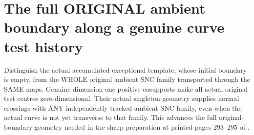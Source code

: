 \section{The full ORIGINAL ambient boundary along a genuine curve test history}

Distinguish the actual accumulated-exceptional template, whose initial
boundary is empty, from the WHOLE original ambient SNC family transported
through the SAME maps. Genuine dimension-one positive cosupports make
all actual original test centres zero-dimensional. Their actual singleton
geometry supplies normal crossings with ANY independently tracked ambient
SNC family, even when the actual curve is not yet transverse to that
family. This advances the full original-boundary geometry needed in the
sharp preparation at printed pages 293--295 of
\cite{bierstone-milman97-invent-math}.

